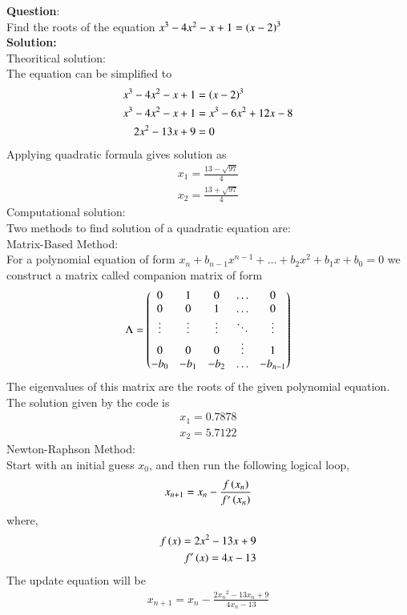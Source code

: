 \documentclass[journal]{IEEEtran}
\begin{document}
\textbf{Question}:\\
Find the roots of the equation $x^3 - 4x^2 - x + 1 = \left(x - 2\right)^3$
\\
\textbf{Solution: }\\
Theoritical solution:\\
The equation can be simplified to
\begin{align}
	x^3 - 4x^2 - x + 1 &= \left(x - 2\right)^3\\
	x^3 - 4x^2 - x + 1 &= x^3-6x^2+12x-8\\
	2x^2 - 13x + 9 &= 0
\end{align}
Applying quadratic formula gives solution as
\begin{align}
	x_1 = \frac{13-\sqrt{97}}{4}\\
	x_2 = \frac{13+\sqrt{97}}{4}
\end{align}
Computational solution:\\
Two methods to find solution of a quadratic equation are:\\
Matrix-Based Method:\\
For a polynomial equation of form $x_n+b_{n-1}x^{n-1}+\dots+b_2x^2+b_1x+b_0 = 0$ we construct a matrix called companion matrix of form
\begin{align}
	\Lambda = \begin{pmatrix}0&1&0&\dots&0\\ 0&0&1&\dots&0\\ \vdots &\vdots &\vdots &\ddots&\vdots\\0&0&0&\vdots&1\\-b_0&-b_1&-b_2&\dots&-b_{n-1}\end{pmatrix}
\end{align}
The eigenvalues of this matrix are the roots of the given polynomial equation.\\
The solution given by the code is
\begin{align}
	x_1 = 0.7878\\
	x_2 = 5.7122
\end{align}
Newton-Raphson Method:\\
Start with an initial guess $x_0$, and then run the following logical loop,
\begin{align}
    x_{n+1} = x_n - \frac{f\left(x_n\right)}{f^{\prime}\left(x_n\right)} 
\end{align}
where,
\begin{align}
    f\left(x\right) = 2x^2 - 13x + 9\\
    f^{\prime}\left(x\right) = 4x-13
\end{align}
The update equation will be
\begin{align}
	x_{n+1} = x_n - \frac{2{x_n}^2 - 13x_n + 9}{4x_n-13}\\
\end{align}
\end{document}
